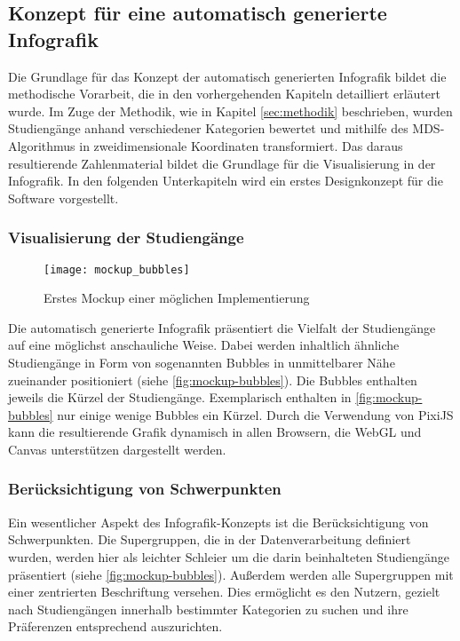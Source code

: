 \subsection{Konzept für eine automatisch generierte Infografik}\label{sec:konzept}
Die Grundlage für das Konzept der automatisch generierten Infografik bildet die methodische Vorarbeit, die in den vorhergehenden Kapiteln detailliert erläutert wurde. Im Zuge der Methodik, wie in Kapitel \ref{sec:methodik} beschrieben, wurden Studiengänge anhand verschiedener Kategorien bewertet und mithilfe des MDS-Algorithmus in zweidimensionale Koordinaten transformiert. Das daraus resultierende Zahlenmaterial bildet die Grundlage für die Visualisierung in der Infografik. In den folgenden Unterkapiteln wird ein erstes Designkonzept für die Software vorgestellt.

\subsubsection{Visualisierung der Studiengänge}

\begin{figure}[H]
    \centering
    \texttt{[image: mockup\_bubbles]}
    \caption{Erstes Mockup einer möglichen Implementierung}
    \label{fig:mockup-bubbles}
\end{figure}

Die automatisch generierte Infografik präsentiert die Vielfalt der Studiengänge
auf eine möglichst anschauliche Weise. Dabei werden inhaltlich ähnliche
Studiengänge in Form von sogenannten \glqq Bubbles\grqq{} in unmittelbarer Nähe 
zueinander positioniert (siehe \autoref{fig:mockup-bubbles}). Die Bubbles
enthalten jeweils die Kürzel der Studiengänge. Exemplarisch enthalten in
\autoref{fig:mockup-bubbles} nur einige wenige Bubbles ein Kürzel. Durch die
Verwendung von PixiJS kann die resultierende Graﬁk dynamisch in allen Browsern,
die WebGL und Canvas unterstützen dargestellt werden.

\subsubsection{Berücksichtigung von Schwerpunkten}
Ein wesentlicher Aspekt des Infografik-Konzepts ist die Berücksichtigung von 
Schwerpunkten. Die Supergruppen, die in der Datenverarbeitung definiert wurden, 
werden hier als leichter Schleier um die darin beinhalteten Studiengänge 
präsentiert (siehe \autoref{fig:mockup-bubbles}). Außerdem werden alle
Supergruppen mit einer zentrierten Beschriftung versehen. Dies ermöglicht es den
Nutzern, gezielt nach Studiengängen innerhalb bestimmter Kategorien zu suchen
und ihre Präferenzen entsprechend auszurichten.

